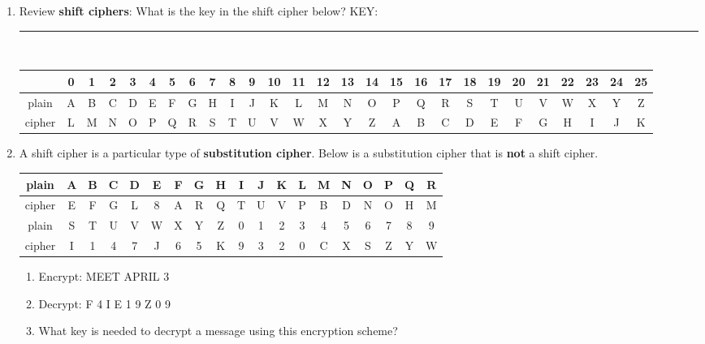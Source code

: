 \documentclass[12pt]{article}
\renewcommand{\emph}[1]{\textsf{\textbf{#1}}}
\newcommand{\ans}[1][1in]{\rule{#1}{.5pt}}
\begin{document}
\begin{enumerate}
\item Review \emph{shift ciphers}: What is the key in the shift cipher below? KEY: \ans\\

\hspace*{-2.2cm}
{\scriptsize
\begin{tabular}{|c|c|c|c|c|c|c|c|c|c|c|c|c|c|c|c|c|c|c|c|c|c|c|c|c|c|c|}
\hline
&0&1&2&3&4&5&6&7&8&9&10&11&12&13&14&15&16&17&18&19&20&21&22&23&24&25\\ \hline \hline
plain& A&B&C&D&E&F&G&H&I&J&K&L&M&N&O&P&Q&R&S&T&U&V&W&X&Y&Z\\  \hline
cipher&L &M&N&O&P&Q&R&S&T&U&V&W&X&Y&Z&A&B&C&D&E&F&G&H&I&J&K\\[12pt]
\hline
\end{tabular}
}
\item A shift cipher is a particular type of \emph{substitution cipher}. Below is a substitution cipher that is \textbf{not} a shift cipher.\\


{\scriptsize
\begin{tabular}{|c|c|c|c|c|c|c|c|c|c|c|c|c|c|c|c|c|c|c|}
\hline
plain& A&B&C&D&E&F&G&H&I&J&K&L&M&N&O&P&Q&R\\  \hline
cipher&E&F&G&L&8&A&R&Q&T&U&V&P&B&D&N&O&H&M\\
\hline \hline
plain&S&T&U&V&W&X&Y&Z&0&1&2&3&4&5&6&7&8&9\\ \hline
cipher&I&1&4&7&J&6&5&K&9&3&2&0&C&X&S&Z&Y&W \\

\hline
\end{tabular}
}
	\begin{enumerate}
	\item Encrypt: \textsf{MEET APRIL 3}
	
	\vfill
	
	\item Decrypt: \textsf{F 4 I E 1 9 Z 0 9}
	
	\vfill
	
	\item What key is needed to decrypt a message using this encryption scheme?
	

\end{enumerate}
\end{enumerate}
\end{document}
